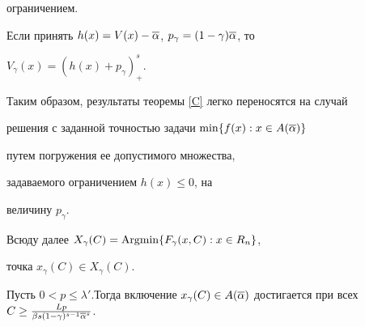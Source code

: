 ограничением.





Если принять $h(x)=V(x)-\overline\alpha$, $p_\gamma=(1-\gamma)\overline\alpha$, то


$V_\gamma(x)=(h(x)+p_\gamma)_+^s$. 


Таким образом, результаты теоремы \ref{C} легко переносятся на случай 


решения с заданной точностью задачи $\min\{f(x): x\in A(\overline\alpha)\}$


путем погружения ее допустимого множества,


задаваемого ограничением $h(x)\leq 0$, на


величину $p_\gamma$.





Всюду далее $X_\gamma(C)=\operatorname{Argmin}\{F_\gamma(x,C): x\in R_n\}$,


точка $x_\gamma (C)\in X_\gamma(C)$.





\begin{thm}\label{C2}


Пусть $0< p\leq\lambda'$.Тогда включение $x_\gamma (C)\in


A(\o\alpha)$ достигается при всех $C\geq\frac{Lp}{\beta


s(1-\gamma)^{s-1}\o\alpha^s}$.


\end{thm}





